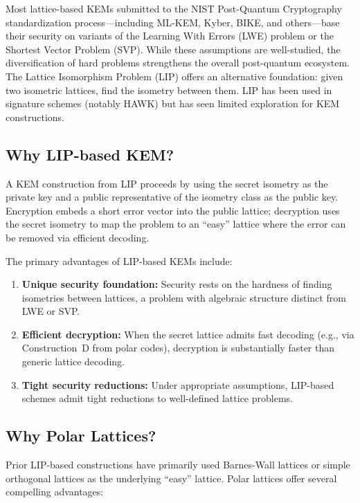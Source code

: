 \documentclass[11pt,a4paper]{article}
\newcommand{\lipPrb}{\textsf{LIP}\xspace}
\newcommand{\NIST}{\textsf{NIST}\xspace}
\newcommand{\MLKEM}{\textsf{ML-KEM}\xspace}
\newcommand{\hwkRef}{\textsf{HAWK}\xspace}
\newcommand{\Kyber}{\textsf{Kyber}\xspace}
\newcommand{\BIKE}{\textsf{BIKE}\xspace}
\begin{document}
Most lattice-based KEMs submitted to the \NIST Post-Quantum Cryptography standardization process---including \MLKEM, \Kyber, \BIKE, and others---base their security on variants of the Learning With Errors (LWE) problem or the Shortest Vector Problem (SVP). While these assumptions are well-studied, the diversification of hard problems strengthens the overall post-quantum ecosystem. The Lattice Isomorphism Problem (\lipPrb) offers an alternative foundation: given two isometric lattices, find the isometry between them. \lipPrb has been used in signature schemes (notably \hwkRef) but has seen limited exploration for KEM constructions.

\subsection{Why LIP-based KEM?}\label{sec:why-lip}

A KEM construction from \lipPrb proceeds by using the secret isometry as the private key and a public representative of the isometry class as the public key. Encryption embeds a short error vector into the public lattice; decryption uses the secret isometry to map the problem to an ``easy'' lattice where the error can be removed via efficient decoding.

The primary advantages of \lipPrb-based KEMs include:
\begin{enumerate}[leftmargin=2em]
\item \textbf{Unique security foundation:} Security rests on the hardness of finding isometries between lattices, a problem with algebraic structure distinct from LWE or SVP.
\item \textbf{Efficient decryption:} When the secret lattice admits fast decoding (e.g., via Construction~D from polar codes), decryption is substantially faster than generic lattice decoding.
\item \textbf{Tight security reductions:} Under appropriate assumptions, \lipPrb-based schemes admit tight reductions to well-defined lattice problems.
\end{enumerate}

\subsection{Why Polar Lattices?}\label{sec:why-polar}

Prior \lipPrb-based constructions have primarily used Barnes-Wall lattices or simple orthogonal lattices as the underlying ``easy'' lattice. Polar lattices offer several compelling advantages:
\end{document}
